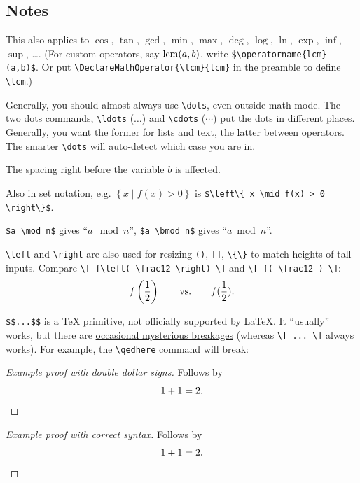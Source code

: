 \documentclass[10pt]{scrartcl}
\begin{document}
\subsection*{Notes}
\begin{enumerate}
  \ii \label{item:operator}
  This also applies to $\cos$, $\tan$, $\gcd$, $\min$, $\max$, $\deg$,
  $\log$, $\ln$, $\exp$, $\inf$, $\sup$, \dots.
  (For custom operators, say $\lcm(a,b)$, write \verb#$\operatorname{lcm}(a,b)$#.
  Or put \verb#\DeclareMathOperator{\lcm}{lcm}# in the preamble to define \verb#\lcm#.)

  \ii \label{item:dots}
  Generally, you should almost always use \verb#\dots#, even outside math mode.
  The two dots commands, \verb#\ldots# ($\ldots$) and \verb#\cdots# ($\cdots$) put the dots
  in different places.
  Generally, you want the former for lists and text, the latter between operators.
  The smarter \verb#\dots# will auto-detect which case you are in.

  \ii \label{item:comma}
  The spacing right before the variable $b$ is affected.

  \ii \label{item:mid}
  Also in set notation, e.g.
  $\left\{ x \mid f(x) > 0 \right\}$ is \verb#$\left\{ x \mid f(x) > 0 \right\}$#.

  \ii \label{item:mod}
  \verb#$a \mod n$# gives ``$a \mod n$'',
  \verb#$a \bmod n$# gives ``$a \bmod n$''.

  \ii \label{item:lr}
  \verb#\left# and \verb#\right# are also used for resizing
  \verb+()+, \verb+[]+, \verb+\{\}+ to match heights of tall inputs.
  Compare \verb+\[ f\left( \frac12 \right) \]+ and \verb+\[ f( \frac12 ) \]+:
  \[ f\left( \frac{1}{2} \right) \qquad \text{vs.} \qquad f(\frac{1}{2}) . \]

  \ii \label{item:display}
  \verb+$$...$$+ is a \TeX{} primitive, not officially supported by \LaTeX.
  It ``usually'' works, but there are
  \href{https://tex.stackexchange.com/q/503/76888}{occasional mysterious breakages}
  (whereas \verb#\[ ... \]# always works).
  For example, the \verb#\qedhere# command will break:
  \begin{proof}[Example proof with double dollar signs]
    Follows by $$1 + 1 = 2. \qedhere$$
  \end{proof}
  \begin{proof}[Example proof with correct syntax]
    Follows by \[ 1 + 1 = 2. \qedhere \]
  \end{proof}
\end{enumerate}

\end{document}
